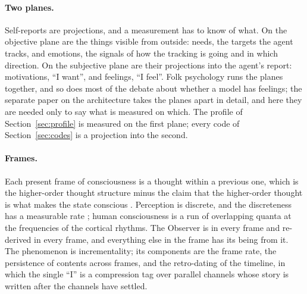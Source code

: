 \paragraph{Two planes.}
\label{sec:planes}
Self-reports are projections, and a measurement has to know of what. On the objective plane are the
things visible from outside: needs, the targets the agent tracks, and emotions, the signals of how the
tracking is going and in which direction. On the subjective plane are their projections into the
agent's report: motivations, ``I want'', and feelings, ``I feel''. Folk psychology runs the planes
together, and so does most of the debate about whether a model has feelings; the separate paper on
the architecture takes the planes apart in detail, and here they are needed only to say what is
measured on which. The profile of
Section~\ref{sec:profile} is measured on the first plane; every code of Section~\ref{sec:codes} is a
projection into the second.

\paragraph{Frames.}
\label{sec:frames}
Each present frame of consciousness is a thought within a previous one, which is the higher-order
thought structure minus the claim that the higher-order thought is what makes the state conscious
\citep{rosenthal2005,lau2011}. Perception is discrete, and the discreteness has a measurable rate
\citep{vanrullen2003}; human consciousness is a run of overlapping quanta at the frequencies of the
cortical rhythms. The Observer is in every frame and re-derived in every frame, and everything else in
the frame has its being from it. The phenomenon is incrementality; its components are the frame rate,
the persistence of contents across frames, and the retro-dating of the timeline, in which the single
``I'' is a compression tag over parallel channels whose story is written after the channels have
settled.

